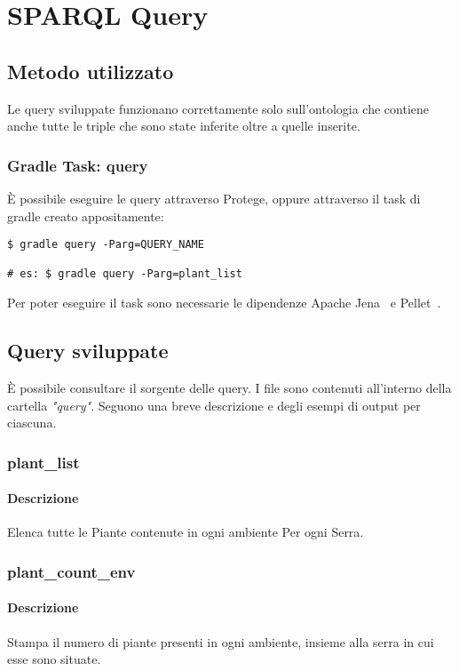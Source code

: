 \section{SPARQL Query}
\subsection{Metodo utilizzato}
Le query sviluppate funzionano correttamente solo sull'ontologia che contiene anche tutte le triple che sono state inferite oltre a quelle inserite.

\subsubsection{Gradle Task: query}
\noindent È possibile eseguire le query attraverso Protege, oppure attraverso il task di gradle creato appositamente:

\begin{verbatim}
$ gradle query -Parg=QUERY_NAME

# es: $ gradle query -Parg=plant_list
\end{verbatim}

\noindent Per poter eseguire il task sono necessarie le dipendenze Apache Jena~\cite{ApacheJe75:online} e Pellet~\cite{AURenpel94:online}.
\subsection{Query sviluppate}
È possibile consultare il sorgente delle query. I file sono contenuti all'interno della cartella \textit{"query"}. Seguono una breve descrizione e degli esempi di output per ciascuna.
\subsubsection{plant\_list}
\paragraph{Descrizione}
Elenca tutte le Piante contenute in ogni ambiente Per ogni Serra.

\subsubsection{plant\_count\_env}
\paragraph{Descrizione}
Stampa il numero di piante presenti in ogni ambiente, insieme alla serra in cui esse sono situate.

